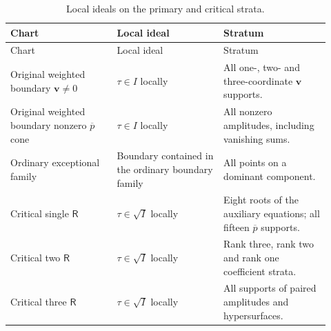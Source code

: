 \begin{longtable}{@{}>{\raggedright\arraybackslash}p{0.305\linewidth}>{\raggedright\arraybackslash}p{0.305\linewidth}>{\raggedright\arraybackslash}p{0.305\linewidth}@{}}

\caption{Local ideals on the primary and critical strata.}\label{supp:tab:r3-primary-ideals}\\
\toprule Chart & Local ideal & Stratum\\\midrule\endfirsthead
\toprule Chart & Local ideal & Stratum\\\midrule\endhead

Original weighted boundary $\boldsymbol v\ne0$ & $\tau\in I$ locally & All one-, two- and three-coordinate $\boldsymbol v$ supports.\\

Original weighted boundary nonzero $\overline p$ cone & $\tau\in I$ locally & All nonzero amplitudes, including vanishing sums.\\

Ordinary exceptional family & Boundary contained in the ordinary boundary family & All points on a dominant component.\\

Critical single $\mathsf R$ & $\tau\in\sqrt I$ locally & Eight roots of the auxiliary equations; all fifteen $\overline p$ supports.\\

Critical two $\mathsf R$ & $\tau\in\sqrt I$ locally & Rank three, rank two and rank one coefficient strata.\\

Critical three $\mathsf R$ & $\tau\in\sqrt I$ locally & All supports of paired amplitudes and hypersurfaces.\\

\bottomrule\end{longtable}

